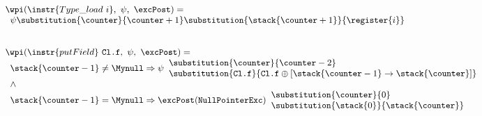 \begin{figure}[t]
\begin{frameit}
\[
\small{
\begin{array}{l}
\wpi(\instr{Type\_load \ i}, \ \psi, \ \excPost)  = \\
\begin{array}{l}  \psi\substitution{\counter }{\counter+1} \substitution{\stack{\counter+1}}{\register{i}} \end{array} \\
\\
\\






 \wpi(\instr{putField} \ \texttt{Cl.f}, \ \psi, \ \excPost)  = \\
\begin{array}{l}

   		\stack{\counter -1} \not= \Mynull\Rightarrow   
	 \psi\begin{array}{l} \substitution{\counter}{ \counter-2 } \\[0 mm] 
   	                   \substitution{\texttt{Cl.f} }{ \texttt{Cl.f}\oplus [\stack{\counter -1} \rightarrow \stack{\counter}] } \\
		\end{array}\\

   \wedge \\
   	\stack{\counter-1} = \Mynull 	\Rightarrow \excPost(\tt{NullPointerExc})
        \begin{array}{l}
          \substitution{ \counter }{ 0} \\
          \substitution{\stack{0}}{ \stack{\counter}} 
	\end{array}
    \end{array} %
\end{array}}
 \]	  \\



\end{frameit}
\end{figure}
